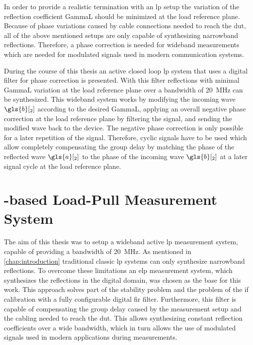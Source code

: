 \documentclass[12pt,a4paper,parskip=full,abstract=true,BCOR=12mm]{scrreprt}
\begin{document}
In order to provide a realistic termination with an \gls{lp} setup the
variation of the reflection coefficient \gls{GammaL} should be minimized at
the load reference plane. Because of phase variations caused by cable connections
needed to reach the \gls{dut}, all of the above mentioned setups are only capable
of synthesizing narrowband reflections. Therefore, a phase correction is
needed for wideband measurements which are needed for modulated signals used
in modern communication systems.

During the course of this thesis an active closed loop \gls{lp} system that uses a digital
filter for phase correction is presented. With this filter reflections with minimal
\gls{GammaL} variation at the load reference plane over a bandwidth of
\SI{20}{\mega\hertz} can be synthesized. This wideband system works by modifying
the incoming wave $\gls{b}[_2]$ according to the desired \gls{GammaL}, applying
an overall negative phase correction at the load reference plane by filtering the signal,
and sending the modified wave back to the device. The negative phase correction is
only possible for a later repetition of the signal. Therefore, cyclic signals have to
be used which allow completely compensating the group delay by matching the
phase of the reflected wave $\gls{a}[_2]$ to the phase of the incoming wave
$\gls{b}[_2]$ at a later signal cycle at the load reference plane.


\chapter{-based Load-Pull Measurement System}
\label{chap:measurement_system}

The aim of this thesis was to setup a wideband active \gls{lp} measurement system, capable of providing a bandwidth of \SI{20}{\mega\hertz}.
As mentioned in \cref{chap:introduction} traditional classic \gls{lp} systems can only synthesize
narrowband reflections. To overcome these limitations an \gls{elp} measurement system, which
synthesizes the reflections in the digital domain, was chosen as the base for this work. This approach solves part of the stability problem
and the problem of the \gls{if} calibration with a fully configurable digital \gls{fir} filter. Furthermore,
this filter is capable of compensating the group delay caused by the measurement setup and
the cabling needed to reach the \gls{dut}. This allows synthesizing constant reflection
coefficients over a wide bandwidth, which in turn allows the use of modulated signals
used in modern applications during measurements.
\end{document}
